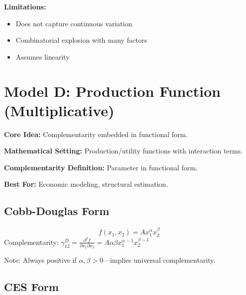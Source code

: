 \textbf{Limitations:}
\begin{itemize}
    \item Does not capture continuous variation
    \item Combinatorial explosion with many factors
    \item Assumes linearity
\end{itemize}

\section{Model D: Production Function (Multiplicative)}
\label{sec:model-d}

\begin{tcolorbox}[colback=green!5!white,colframe=green!75!black,title=\textbf{Model D Overview}]
\textbf{Core Idea:} Complementarity embedded in functional form.

\textbf{Mathematical Setting:} Production/utility functions with interaction terms.

\textbf{Complementarity Definition:} Parameter in functional form.

\textbf{Best For:} Economic modeling, structural estimation.
\end{tcolorbox}

\subsection{Cobb-Douglas Form}

\begin{definition}
\begin{equation}
f(x_1, x_2) = A x_1^{\alpha} x_2^{\beta}
\end{equation}
Complementarity: $\gamma^D_{12} = \frac{\partial^2 f}{\partial x_1 \partial x_2} = A \alpha \beta x_1^{\alpha-1} x_2^{\beta-1}$

Note: Always positive if $\alpha, \beta > 0$—implies universal complementarity.
\end{definition}

\subsection{CES Form}

